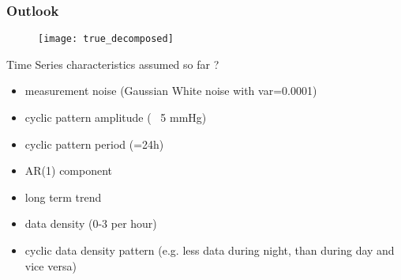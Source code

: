 \documentclass[
	8pt, %
]{beamer}
\begin{document}
\begin{frame}[fragile]
	\frametitle{Outlook}

%
%

	\begin{figure}
			\texttt{[image: true\_decomposed]}
	\end{figure}


	Time Series characteristics assumed so far ?
	\begin{itemize}
		\item measurement noise (Gaussian White noise with var=0.0001)
		\item cyclic pattern amplitude (~ 5 mmHg)
		\item cyclic pattern period (=24h)
		\item AR(1) component
		\item long term trend
		\item data density (0-3 per hour)
		\item cyclic data density pattern (e.g. less data during night, than during day and vice versa)
	\end{itemize}
\end{frame}
\end{document}

